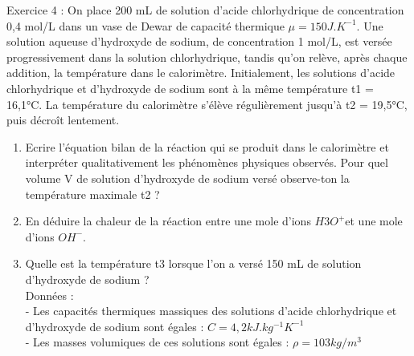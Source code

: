 \documentclass[12pt, french]{article}
\begin{document}
\begin{Box2}{Exercice 4 : }
On place 200 mL de solution d’acide chlorhydrique de concentration 0,4 mol/L dans un vase de Dewar de
capacité thermique $\mu = 150 J.K^{-1}$.
Une solution aqueuse d’hydroxyde de sodium, de concentration 1 mol/L, est versée progressivement dans
la solution chlorhydrique, tandis qu’on relève, après chaque addition, la température dans le calorimètre.
Initialement, les solutions d’acide chlorhydrique et d’hydroxyde de sodium sont à la même température t1 = 16,1°C. La température du calorimètre s’élève régulièrement jusqu’à t2 = 19,5°C, puis décroît lentement.
  \begin{enumerate}
\item    Ecrire l’équation bilan de la réaction qui se produit dans le calorimètre et interpréter qualitativement les
phénomènes physiques observés. Pour quel volume V de solution d’hydroxyde de sodium versé observe-ton la température maximale t2 ?
\item En déduire la chaleur de la réaction entre une mole d’ions $H3O^+$et une mole d’ions $OH^-$.
\item  Quelle est la température t3 lorsque l’on a versé 150 mL de solution d’hydroxyde de sodium ?
\\Données :
\\- Les capacités thermiques massiques des solutions d’acide chlorhydrique et d’hydroxyde de sodium sont
égales : $C = 4,2 kJ.kg^{-1}K^{-1}$
\\- Les masses volumiques de ces solutions sont égales : $\rho = 103 kg/m^3$
  \end{enumerate}
\end{Box2}




\end{document}
